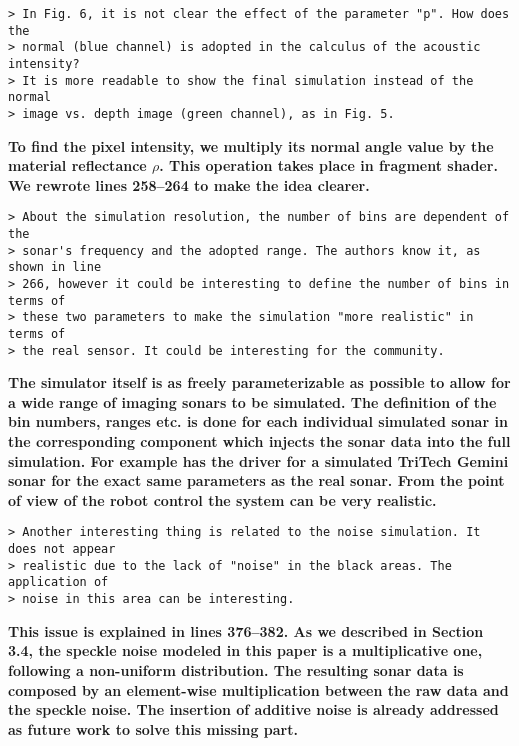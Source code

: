\documentclass{article}
\begin{document}
\begin{verbatim}
> In Fig. 6, it is not clear the effect of the parameter "p". How does the
> normal (blue channel) is adopted in the calculus of the acoustic intensity?
> It is more readable to show the final simulation instead of the normal
> image vs. depth image (green channel), as in Fig. 5.
\end{verbatim}

\textbf{To find the pixel intensity, we multiply its normal angle value by the
material reflectance $\rho$. This operation takes place in fragment shader.
We rewrote lines 258--264 to make the idea clearer. }

\begin{verbatim}
> About the simulation resolution, the number of bins are dependent of the
> sonar's frequency and the adopted range. The authors know it, as shown in line
> 266, however it could be interesting to define the number of bins in terms of
> these two parameters to make the simulation "more realistic" in terms of
> the real sensor. It could be interesting for the community.
\end{verbatim}

\textbf{The simulator itself is as freely parameterizable as possible to allow for a wide range of imaging 
sonars to be simulated. The definition of the bin numbers, ranges etc. is done for each individual 
simulated sonar in the corresponding component which injects the sonar data into the full simulation. 
For example has the driver for a simulated TriTech Gemini sonar for the exact same parameters as the 
real sonar. From the point of view of the robot control the system can be very realistic.}

\begin{verbatim}
> Another interesting thing is related to the noise simulation. It does not appear
> realistic due to the lack of "noise" in the black areas. The application of
> noise in this area can be interesting.
\end{verbatim}

\textbf{This issue is explained in lines 376--382. As we described in
Section 3.4, the speckle noise modeled in this paper is a multiplicative one,
following a non-uniform distribution. The resulting sonar data is composed by
an element-wise multiplication between the raw data and the speckle noise. The
insertion of additive noise is already addressed as future work to solve this
missing part.}
\end{document}
